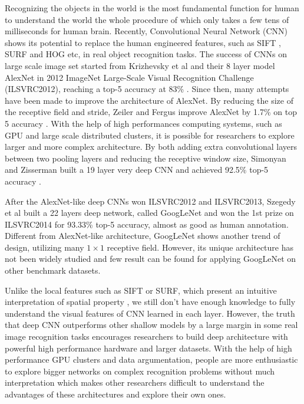 ﻿Recognizing the objects in the world is the most fundamental function for human to understand the world the whole procedure of which only takes a few tens of milliseconds for human brain.
Recently, Convolutional Neural Network (CNN) shows its potential to replace the human engineered features, such as SIFT \cite{lowe1999object}, SURF \cite{bay2006surf} and HOG \cite{dalal2005histograms} etc, in real object recognition tasks. The success of CNNs on large scale image set started from Krizhevsky et al and their 8 layer model AlexNet in 2012 ImageNet Large-Scale Visual Recognition Challenge (ILSVRC2012), reaching a top-5 accuracy at 83\% \cite{krizhevsky2012imagenet}. Since then, many attempts have been made to improve the architecture of AlexNet.
By reducing the size of the receptive field and stride, Zeiler and Fergus improve AlexNet by 1.7\% on top 5 accuracy \cite{zeiler2014visualizing}. With the help of high performances computing systems, such as GPU and large scale distributed clusters, it is possible for researchers to explore larger and more complex architecture. By both adding extra convolutional layers between two pooling layers and reducing the receptive window size, Simonyan and Zisserman built a 19 layer very deep CNN and achieved 92.5\% top-5 accuracy \cite{simonyan2014very}.

After the AlexNet-like deep CNNs won ILSVRC2012 and ILSVRC2013, Szegedy et al built a 22 layers deep network, called GoogLeNet and won the 1st prize on ILSVRC2014 for 93.33\% top-5 accuracy, almost as good as human annotation\cite{szegedy2014going}. Different from AlexNet-like architecture, GoogLeNet shows another trend of design, utilizing many $1\times 1$ receptive field. However, its unique architecture has not been widely studied and few result can be found for applying GoogLeNet on other benchmark datasets.

Unlike the local features such as SIFT or SURF, which present an intuitive interpretation of spatial property%
, we still don't have enough knowledge to fully understand the visual features of CNN learned in each layer.
However, the truth that deep CNN outperforms other shallow models by a large margin in some real image recognition tasks encourages researchers to build deep architecture with powerful high performance hardware and larger datasets. With the help of high performance GPU clusters and data argumentation, people are more enthusiastic to explore bigger networks on complex recognition problems without much interpretation which makes other researchers difficult to understand the advantages of these architectures and explore their own ones.

